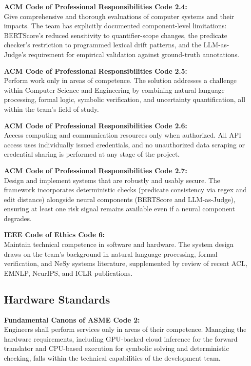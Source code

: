 \textbf{ACM Code of Professional Responsibilities Code 2.4:}\\
Give comprehensive and thorough evaluations of computer systems and their impacts. The team has explicitly documented component-level limitations: BERTScore's reduced sensitivity to quantifier-scope changes, the predicate checker's restriction to programmed lexical drift patterns, and the LLM-as-Judge's requirement for empirical validation against ground-truth annotations.

\textbf{ACM Code of Professional Responsibilities Code 2.5:}\\
Perform work only in areas of competence. The solution addresses a challenge within Computer Science and Engineering by combining natural language processing, formal logic, symbolic verification, and uncertainty quantification, all within the team's field of study.

\textbf{ACM Code of Professional Responsibilities Code 2.6:}\\
Access computing and communication resources only when authorized. All API access uses individually issued credentials, and no unauthorized data scraping or credential sharing is performed at any stage of the project.

\textbf{ACM Code of Professional Responsibilities Code 2.7:}\\
Design and implement systems that are robustly and usably secure. The framework incorporates deterministic checks (predicate consistency via regex and edit distance) alongside neural components (BERTScore and LLM-as-Judge), ensuring at least one risk signal remains available even if a neural component degrades.

\textbf{IEEE Code of Ethics Code 6:}\\
Maintain technical competence in software and hardware. The system design draws on the team's background in natural language processing, formal verification, and NeSy systems literature, supplemented by review of recent ACL, EMNLP, NeurIPS, and ICLR publications.

\subsection{Hardware Standards}

\textbf{Fundamental Canons of ASME Code 2:}\\
Engineers shall perform services only in areas of their competence. Managing the hardware requirements, including GPU-backed cloud inference for the forward translator and CPU-based execution for symbolic solving and deterministic checking, falls within the technical capabilities of the development team.

